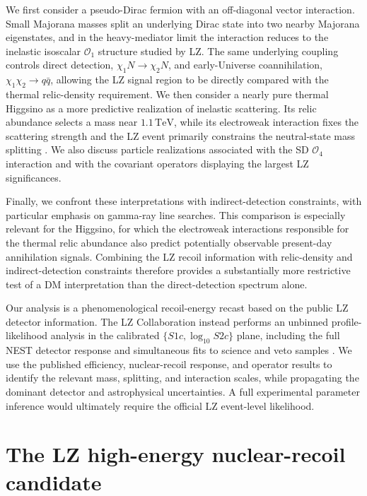 \documentclass[aps,prd,reprint,superscriptaddress,nofootinbib,longbibliography,floatfix]{revtex4-2}
\newcommand{\TeV}{\mathrm{TeV}}
\begin{document}
We first consider a pseudo-Dirac fermion with an off-diagonal vector interaction. Small Majorana masses split an underlying Dirac state into two nearby Majorana eigenstates, and in the heavy-mediator limit the interaction reduces to the inelastic isoscalar $\mathcal{O}_1$ structure studied by LZ. The same underlying coupling controls direct detection, $\chi_1 N\rightarrow\chi_2 N$, and early-Universe coannihilation, $\chi_1\chi_2\rightarrow q\bar q$, allowing the LZ signal region to be directly compared with the thermal relic-density requirement. We then consider a nearly pure thermal Higgsino as a more predictive realization of inelastic scattering. Its relic abundance selects a mass near $1.1\,\TeV$, while its electroweak interaction fixes the scattering strength and the LZ event primarily constrains the neutral-state mass splitting \cite{KrallReece2018,Graham2025}. We also discuss particle realizations associated with the SD $\mathcal{O}_4$ interaction and with the covariant operators displaying the largest LZ significances.

Finally, we confront these interpretations with indirect-detection constraints, with particular emphasis on gamma-ray line searches. This comparison is especially relevant for the Higgsino, for which the electroweak interactions responsible for the thermal relic abundance also predict potentially observable present-day annihilation signals. Combining the LZ recoil information with relic-density and indirect-detection constraints therefore provides a substantially more restrictive test of a DM interpretation than the direct-detection spectrum alone.

Our analysis is a phenomenological recoil-energy recast based on the public LZ detector information. The LZ Collaboration instead performs an unbinned profile-likelihood analysis in the calibrated $\{S1c,\log_{10}S2c\}$ plane, including the full NEST detector response and simultaneous fits to science and veto samples \cite{LZ2026Extended}. We use the published efficiency, nuclear-recoil response, and operator results to identify the relevant mass, splitting, and interaction scales, while propagating the dominant detector and astrophysical uncertainties. A full experimental parameter inference would ultimately require the official LZ event-level likelihood.




\section{The LZ high-energy nuclear-recoil candidate}
\end{document}
